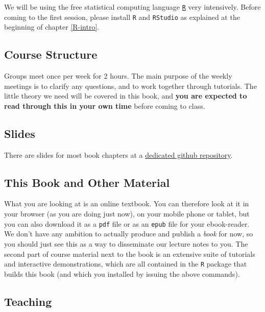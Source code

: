 \documentclass[]{book}
\begin{document}
We will be using the free statistical computing language \href{https://www.r-project.org}{\texttt{R}} very intensively. Before coming to the first session, please install \texttt{R} and \texttt{RStudio} as explained at the beginning of chapter \ref{R-intro}.

\hypertarget{course-structure}{%
\subsection*{Course Structure}\label{course-structure}}

Groups meet once per week for 2 hours. The main purpose of the weekly meetings is to clarify any questions, and to work together through tutorials. The little theory we need will be covered in this book, and \textbf{you are expected to read through this in your own time} before coming to class.

\hypertarget{slides}{%
\subsection*{Slides}\label{slides}}

There are slides for most book chapters at a \href{https://github.com/michelefioretti/ScPoEconometrics-Slides}{dedicated github repository}.

\hypertarget{this-book-and-other-material}{%
\subsection*{This Book and Other Material}\label{this-book-and-other-material}}

What you are looking at is an online textbook. You can therefore look at it in your browser (as you are doing just now), on your mobile phone or tablet, but you can also download it as a \texttt{pdf} file or as an \texttt{epub} file for your ebook-reader. We don't have any ambition to actually produce and publish a \emph{book} for now, so you should just see this as a way to disseminate our lecture notes to you.
The second part of course material next to the book is an extensive suite of tutorials and interactive demonstrations, which are all contained in the \texttt{R} package that builds this book (and which you installed by issuing the above commands).

\hypertarget{teaching}{%
\subsection*{Teaching}\label{teaching}}
\end{document}
